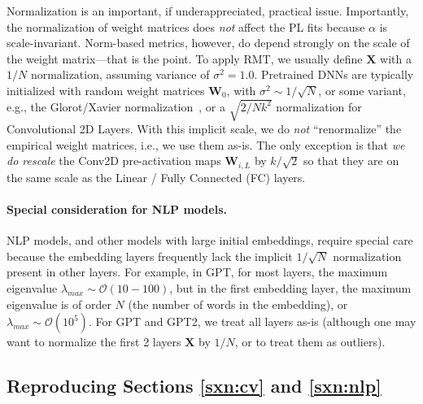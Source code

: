 Normalization is an important, if underappreciated, practical issue.
Importantly, the normalization of weight matrices does \emph{not} affect the PL fits because $\alpha$ is scale-invariant.
Norm-based metrics, however, do depend strongly on the scale of the weight matrix---that is the point.
To apply RMT, we usually define $\mathbf{X}$ with a $1/N$ normalization, assuming variance of $\sigma^{2}=1.0$.
Pretrained DNNs are typically initialized with random weight matrices $\mathbf{W}_{0}$, with
 $\sigma^{2}\sim 1/\sqrt{N}$, or some variant, e.g., the Glorot/Xavier normalization~\cite{GloBen10}, or a $\sqrt{2/Nk^2}$ normalization for Convolutional 2D Layers. With this implicit scale, 
we do \emph{not} ``renormalize'' the empirical weight matrices, i.e., we use them as-is.
The only exception is that \emph{we do rescale} the Conv2D pre-activation maps $\mathbf{W}_{i,L}$ 
by $k/\sqrt{2}$ so that they are on the same scale as the Linear / Fully Connected (FC) layers.


\paragraph{Special consideration for NLP models.}

NLP models, and other models with large initial embeddings, require special care because the embedding layers frequently lack the implicit $1/\sqrt{N}$ normalization present in other layers.
For example, in GPT, for most layers, the maximum eigenvalue $\lambda_{max}\sim\mathcal{O}(10-100)$, but in the first embedding layer, the maximum eigenvalue is of order $N$ (the number of words in the embedding), or $\lambda_{max}\sim\mathcal{O}(10^{5})$.  
For GPT and GPT2, we treat all layers as-is (although one may want to normalize the first 2 layers $\mathbf{X}$ by $1/N$, or to treat them as outliers).


\subsection{Reproducing Sections \ref{sxn:cv} and \ref{sxn:nlp} }   %

